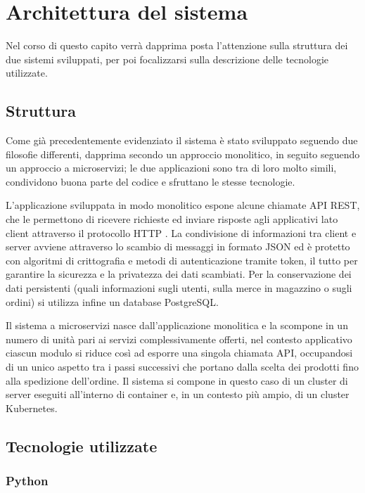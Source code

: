 \chapter{Architettura del sistema}

	Nel corso di questo capito verrà dapprima posta l'attenzione sulla struttura dei due sistemi sviluppati, per poi focalizzarsi sulla descrizione delle tecnologie utilizzate.


\section{Struttura}
	
	Come già precedentemente evidenziato il sistema è stato sviluppato seguendo due filosofie differenti, dapprima secondo un approccio monolitico, in seguito seguendo un approccio a microservizi;
	le due applicazioni sono tra di loro molto simili, condividono buona parte del codice e sfruttano le stesse tecnologie.
	
	\smallskip
	L'applicazione sviluppata in modo monolitico espone alcune chiamate API REST, che le permettono di ricevere richieste ed inviare risposte agli applicativi lato client attraverso il protocollo HTTP .
	La condivisione di informazioni tra client e server avviene attraverso lo scambio di messaggi in formato JSON ed è protetto con algoritmi di crittografia e metodi di autenticazione tramite token, il tutto per garantire la sicurezza e la privatezza dei dati scambiati.
	Per la conservazione dei dati persistenti (quali informazioni sugli utenti, sulla merce in magazzino o sugli ordini) si utilizza infine un database PostgreSQL.
	
	\smallskip
	Il sistema a microservizi nasce dall'applicazione monolitica e la scompone in un numero di unità pari ai servizi complessivamente offerti, nel contesto applicativo ciascun modulo si riduce così ad esporre una singola chiamata API, occupandosi di un unico aspetto tra i passi successivi che portano dalla scelta dei prodotti fino alla spedizione dell'ordine.
	Il sistema si compone in questo caso di un cluster di server eseguiti all'interno di container e, in un contesto più ampio, di un cluster Kubernetes.



\section{Tecnologie utilizzate}

\subsection{Python}
	
